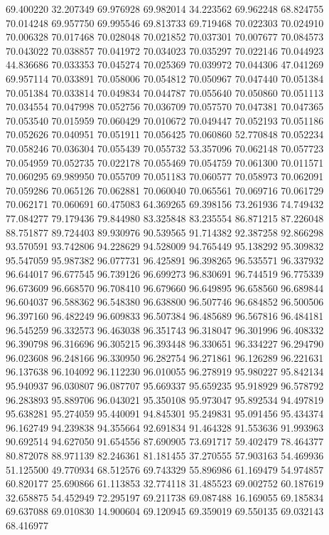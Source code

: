 69.400220
32.207349
69.976928
69.982014
34.223562
69.962248
68.824755
70.014248
69.957750
69.995546
69.813733
69.719468
70.022303
70.024910
70.006328
70.017468
70.028048
70.021852
70.037301
70.007677
70.084573
70.043022
70.038857
70.041972
70.034023
70.035297
70.022146
70.044923
44.836686
70.033353
70.045274
70.025369
70.039972
70.044306
47.041269
69.957114
70.033891
70.058006
70.054812
70.050967
70.047440
70.051384
70.051384
70.033814
70.049834
70.044787
70.055640
70.050860
70.051113
70.034554
70.047998
70.052756
70.036709
70.057570
70.047381
70.047365
70.053540
70.015959
70.060429
70.010672
70.049447
70.052193
70.051186
70.052626
70.040951
70.051911
70.056425
70.060860
52.770848
70.052234
70.058246
70.036304
70.055439
70.055732
53.357096
70.062148
70.057723
70.054959
70.052735
70.022178
70.055469
70.054759
70.061300
70.011571
70.060295
69.989950
70.055709
70.051183
70.060577
70.058973
70.062091
70.059286
70.065126
70.062881
70.060040
70.065561
70.069716
70.061729
70.062171
70.060691
60.475083
64.369265
69.398156
73.261936
74.749432
77.084277
79.179436
79.844980
83.325848
83.235554
86.871215
87.226048
88.751877
89.724403
89.930976
90.539565
91.714382
92.387258
92.866298
93.570591
93.742806
94.228629
94.528009
94.765449
95.138292
95.309832
95.547059
95.987382
96.077731
96.425891
96.398265
96.535571
96.337932
96.644017
96.677545
96.739126
96.699273
96.830691
96.744519
96.775339
96.673609
96.668570
96.708410
96.679660
96.649895
96.658560
96.689844
96.604037
96.588362
96.548380
96.638800
96.507746
96.684852
96.500506
96.397160
96.482249
96.609833
96.507384
96.485689
96.567816
96.484181
96.545259
96.332573
96.463038
96.351743
96.318047
96.301996
96.408332
96.390798
96.316696
96.305215
96.393448
96.330651
96.334227
96.294790
96.023608
96.248166
96.330950
96.282754
96.271861
96.126289
96.221631
96.137638
96.104092
96.112230
96.010055
96.278919
95.980227
95.842134
95.940937
96.030807
96.087707
95.669337
95.659235
95.918929
96.578792
96.283893
95.889706
96.043021
95.350108
95.973047
95.892534
94.497819
95.638281
95.274059
95.440091
94.845301
95.249831
95.091456
95.434374
96.162749
94.239838
94.355664
92.691834
91.464328
91.553636
91.993963
90.692514
94.627050
91.654556
87.690905
73.691717
59.402479
78.464377
80.872078
88.971139
82.246361
81.181455
37.270555
57.903163
54.469936
51.125500
49.770934
68.512576
69.743329
55.896986
61.169479
54.974857
60.820177
25.690866
61.113853
32.774118
31.485523
69.002752
60.187619
32.658875
54.452949
72.295197
69.211738
69.087488
16.169055
69.185834
69.637088
69.010830
14.900604
69.120945
69.359019
69.550135
69.032143
68.416977
